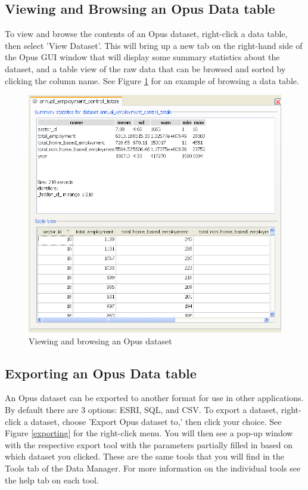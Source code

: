 \subsection{Viewing and Browsing an Opus Data table}
To view and browse the contents of an Opus dataset, right-click a data table, then select 'View Dataset'.  This will bring up a new tab on the right-hand side of the Opus GUI window that will display some summary statistics about the dataset, and a table view of the raw data that can be browsed and sorted by clicking the column name.  See Figure \ref{view-and-browse} for an example of browsing a data table.

\begin{figure}[htp]
\begin{center}
\includegraphics[scale=0.5]{part-gui/images/data-manager-opus-data-tab-view-dataset-tab.png}
\end{center}
\caption{Viewing and browsing an Opus dataset}
\label{view-and-browse}
\end{figure}

\subsection{Exporting an Opus Data table}
An Opus dataset can be exported to another format for use in other applications.  By default there are 3 options: ESRI, SQL, and CSV.  To export a dataset, right-click a dataset, choose 'Export Opus dataset to,' then click your choice.  See Figure \ref{exporting} for the right-click menu.  You will then see a pop-up window with the respective export tool with the parameters partially filled in based on which dataset you clicked.  These are the same tools that you will find in the Tools tab of the Data Manager.  For more information on the individual tools see the help tab on each tool.

